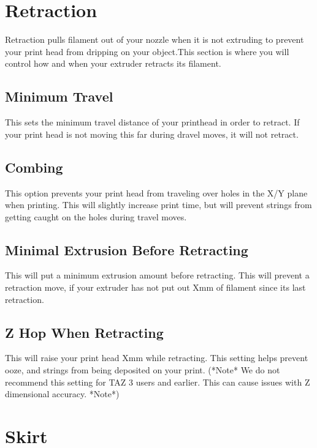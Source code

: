 \section{Retraction}

Retraction pulls filament out of your nozzle when it is not extruding to prevent your print head from dripping on your object.This section is where you will control how and when your extruder retracts its filament.

\subsection{Minimum Travel}

This sets the minimum travel distance of your printhead in order to retract. If your print head is not moving this far during dravel moves, it will not retract.

\subsection{Combing}

This option prevents your print head from traveling over holes in the X/Y plane when printing. This will slightly increase print time, but will prevent strings from getting caught on the holes during travel moves.

\subsection{Minimal Extrusion Before Retracting}

This will put a minimum extrusion amount before retracting. This will prevent a retraction move, if your extruder has not put out Xmm of filament since its last retraction.

\subsection{Z Hop When Retracting}

This will raise your print head Xmm while retracting. This setting helps prevent ooze, and strings from being deposited on your print. (*Note* We do not recommend this setting for TAZ 3 users and earlier. This can cause issues with Z dimensional accuracy. *Note*)

\section{Skirt}


